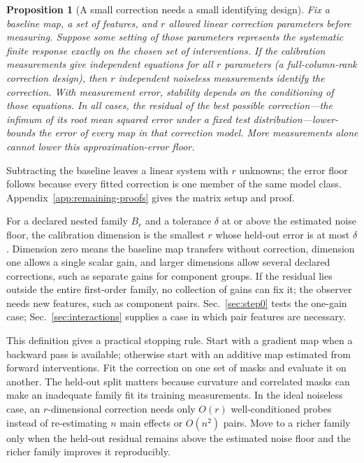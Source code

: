 \documentclass[sigconf,10pt,nonacm,balance=false]{acmart}
\newtheorem{proposition}{Proposition}
\begin{document}
\begin{proposition}[A small correction needs a small identifying design]\label{prop:caldim}
Fix a baseline map, a set of features, and $r$ allowed linear correction parameters before measuring. Suppose some setting of those parameters represents the systematic finite response exactly on the chosen set of interventions. If the calibration measurements give independent equations for all $r$ parameters (a full-column-rank correction design), then $r$ independent noiseless measurements identify the correction. With measurement error, stability depends on the conditioning of those equations. In all cases, the residual of the best possible correction---the infimum of its root mean squared error under a fixed test distribution---lower-bounds the error of every map in that correction model. More measurements alone cannot lower this approximation-error floor.
\end{proposition}

Subtracting the baseline leaves a linear system with $r$ unknowns; the error floor follows because every fitted correction is one member of the same model class. Appendix~\ref{app:remaining-proofs} gives the matrix setup and proof.

For a declared nested family $B_r$ and a tolerance $\delta$ at or above the estimated noise floor, the calibration dimension is the smallest $r$ whose held-out error is at most $\delta$. Dimension zero means the baseline map transfers without correction, dimension one allows a single scalar gain, and larger dimensions allow several declared corrections, such as separate gains for component groups. If the residual lies outside the entire first-order family, no collection of gains can fix it; the observer needs new features, such as component pairs. Sec.~\ref{sec:step0} tests the one-gain case; Sec.~\ref{sec:interactions} supplies a case in which pair features are necessary.

This definition gives a practical stopping rule. Start with a gradient map when a backward pass is available; otherwise start with an additive map estimated from forward interventions. Fit the correction on one set of masks and evaluate it on another. The held-out split matters because curvature and correlated masks can make an inadequate family fit its training measurements. In the ideal noiseless case, an $r$-dimensional correction needs only $O(r)$ well-conditioned probes instead of re-estimating $n$ main effects or $O(n^2)$ pairs. Move to a richer family only when the held-out residual remains above the estimated noise floor and the richer family improves it reproducibly.
\end{document}
